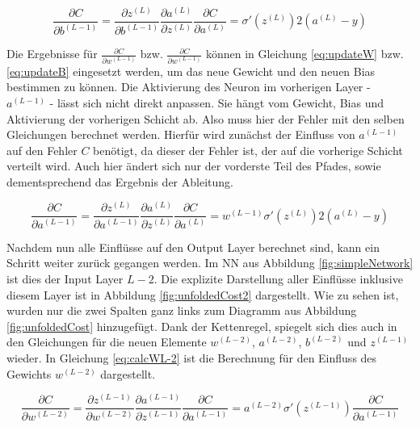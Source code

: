 \begin{equation}
    \frac{\partial C }{\partial b^{(L-1)}} =  
    \frac{\partial z^{(L)} }{\partial b^{(L-1)}}
    \frac{\partial a^{(L)} }{\partial z^{(L)}}
    \frac{\partial C }{\partial a^{(L)}} =  \sigma'(z^{(L)})
    2(a^{(L)}-y)
\end{equation}

Die Ergebnisse für $\frac{\partial C }{\partial w^{(L-1)}}$  bzw. $\frac{\partial C }{\partial w^{(L-1)}}$ können in Gleichung \ref{eq:updateW} bzw. \ref{eq:updateB} eingesetzt werden, um das neue Gewicht und den neuen Bias bestimmen zu können. Die Aktivierung des Neuron im vorherigen Layer - $a^{(L-1)}$ - lässt sich nicht direkt anpassen. Sie hängt vom Gewicht, Bias und Aktivierung der vorherigen Schicht ab. Also muss hier der Fehler mit den selben Gleichungen berechnet werden. Hierfür wird zunächst der Einfluss von $a^{(L-1)}$ auf den Fehler $C$ benötigt, da dieser der Fehler ist, der auf die vorherige Schicht verteilt wird. Auch hier ändert sich nur der vorderste Teil des Pfades, sowie dementsprechend das Ergebnis der Ableitung.

\begin{equation} \label{eq:partialCpartialaL-1}
    \frac{\partial C }{\partial a^{(L-1)}} =  
    \frac{\partial z^{(L)} }{\partial a^{(L-1)}}
    \frac{\partial a^{(L)} }{\partial z^{(L)}}
    \frac{\partial C }{\partial a^{(L)}} = w^{(L-1)}\sigma'(z^{(L)})
    2(a^{(L)}-y)
\end{equation}

Nachdem nun alle Einflüsse auf den Output Layer berechnet sind, kann ein Schritt weiter zurück gegangen werden. Im \ac{NN} aus Abbildung \ref{fig:simpleNetwork} ist dies der Input Layer $L-2$. Die explizite Darstellung aller Einflüsse inklusive diesem Layer ist in Abbildung \ref{fig:unfoldedCost2} dargestellt. Wie zu sehen ist, wurden nur die zwei Spalten ganz links zum Diagramm aus Abbildung \ref{fig:unfoldedCost} hinzugefügt. Dank der Kettenregel, spiegelt sich dies auch in den Gleichungen für die neuen Elemente $w^{(L-2)}$, $a^{(L-2)}$, $b^{(L-2)}$ und $z^{(L-1)}$ wieder. In Gleichung \ref{eq:calcWL-2} ist die Berechnung für den Einfluss des Gewichts $w^{(L-2)}$ dargestellt.

\begin{equation} \label{eq:calcWL-2}
    \frac{\partial C }{\partial w^{(L-2)}} = 
    \frac{\partial z^{(L-1)} }{\partial w^{(L-2)}}
    \frac{\partial a^{(L-1)} }{\partial z^{(L-1)}}
    \frac{\partial C }{\partial a^{(L-1)}} = 
    a^{(L-2)}\sigma'(z^{(L-1)}) \frac{\partial C}{\partial a^{(L-1)}}
\end{equation}

